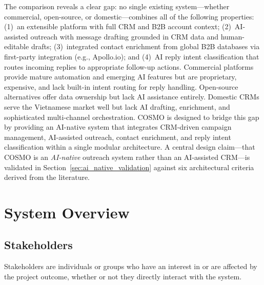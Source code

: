 \documentclass[a4paper]{article}
\begin{document}
The comparison reveals a clear gap: no single existing 
system---whether commercial, open-source, or domestic---combines all 
of the following properties: (1)~an extensible platform 
with full CRM and B2B account context; (2)~AI-assisted outreach with 
message drafting grounded in CRM data and human-editable drafts; 
(3)~integrated contact enrichment from global B2B databases via 
first-party integration (e.g., Apollo.io); and (4)~AI reply intent 
classification that routes incoming replies to appropriate follow-up 
actions. Commercial platforms provide mature automation and emerging 
AI features but are proprietary, expensive, and lack built-in intent 
routing for reply handling. Open-source alternatives offer data 
ownership but lack AI assistance entirely. Domestic CRMs serve the 
Vietnamese market well but lack AI drafting, enrichment, and 
sophisticated multi-channel orchestration. COSMO is designed to 
bridge this gap by providing an AI-native system that 
integrates CRM-driven campaign management, AI-assisted outreach, 
contact enrichment, and reply intent classification within a single 
modular architecture. A central 
design claim---that COSMO is an \emph{AI-native} outreach system 
rather than an AI-assisted CRM---is validated in 
Section~\ref{sec:ai_native_validation} against six architectural 
criteria derived from the literature.


\newpage
\section{System Overview}
\label{ch:overview}
\subsection{Stakeholders}

Stakeholders are individuals or groups who have an interest in or 
are affected by the project outcome, whether or not they directly 
interact with the system.
\end{document}
